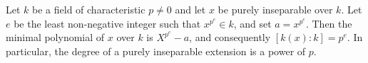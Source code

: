 Let $k$ be a field of characteristic $p \neq 0$ and let $x$ be purely inseparable over $k$. Let $e$ be the least non-negative integer such that $x^{p^e} \in k$, and set $a = x^{p^e}$. Then the minimal polynomial of $x$ over $k$ is $X^{p^e} - a$, and consequently $[k(x) : k] = p^e$. In particular, the degree of a purely inseparable extension is a power of $p$.
